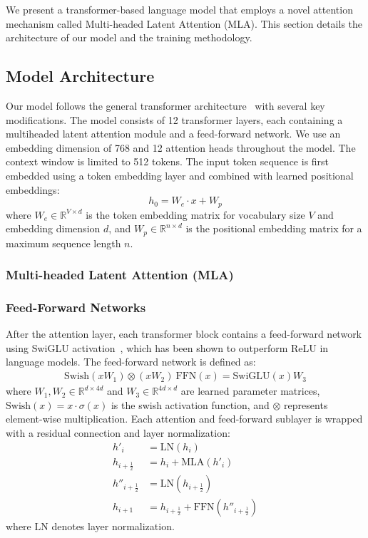 We present a transformer-based language model that employs a novel attention mechanism called Multi-headed Latent Attention (MLA). This section details the architecture of our model and the training methodology.
\subsection{Model Architecture}
Our model follows the general transformer architecture~\cite{vaswani2017attention} with several key modifications. The model consists of 12 transformer layers, each containing a multiheaded latent attention module and a feed-forward network. We use an embedding dimension of 768 and 12 attention heads throughout the model. The context window is limited to 512 tokens.
The input token sequence is first embedded using a token embedding layer and combined with learned positional embeddings:
\begin{equation}
h_0 = W_e \cdot x + W_p
\end{equation}
\noindent where $W_e \in \mathbb{R}^{V \times d}$ is the token embedding matrix for vocabulary size $V$ and embedding dimension $d$, and $W_p \in \mathbb{R}^{n \times d}$ is the positional embedding matrix for a maximum sequence length $n$.
\subsubsection{Multi-headed Latent Attention (MLA)}

\subsubsection{Feed-Forward Networks}
After the attention layer, each transformer block contains a feed-forward network using SwiGLU activation~\cite{shazeer2020glu}, which has been shown to outperform ReLU in language models. The feed-forward network is defined as:
\begin{align}
\text{Swish}(xW_1) \otimes (xW_2) \
\text{FFN}(x) = \text{SwiGLU}(x)W_3
\end{align}
\noindent where $W_1, W_2 \in \mathbb{R}^{d \times 4d}$ and $W_3 \in \mathbb{R}^{4d \times d}$ are learned parameter matrices, $\text{Swish}(x) = x \cdot \sigma(x)$ is the swish activation function, and $\otimes$ represents element-wise multiplication.
Each attention and feed-forward sublayer is wrapped with a residual connection and layer normalization:
\begin{align}
  h'_i &= \mathrm{LN}(h_i) \\
  h_{i+\frac12} &= h_i + \mathrm{MLA}(h'_i) \\
  h''_{i+\frac12} &= \mathrm{LN}(h_{i+\frac12}) \\
  h_{i+1} &= h_{i+\frac12} + \mathrm{FFN}(h''_{i+\frac12})
\end{align}
\noindent where $\text{LN}$ denotes layer normalization.
